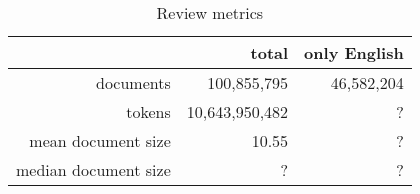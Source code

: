\begin{table}[h]
    \centering
    \begin{tabular}{r|r|r}
    & total & only English\\\hline
        documents   &  100,855,795 & 46,582,204\\
        tokens & 10,643,950,482 & ?\\
        mean document size & 10.55 & ?\\
        median document size & ? & ?
    \end{tabular}
    \caption{Review metrics}
    \label{tab:review_metrics}
\end{table}